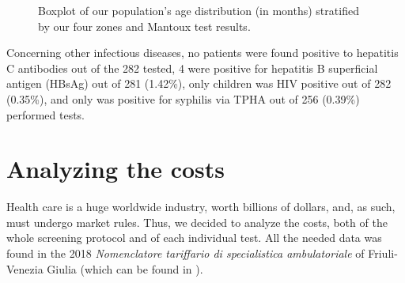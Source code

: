 \begin{figure}[H]
\caption{Boxplot of our population's age distribution (in months) stratified by our four zones and Mantoux test results.}
\label{fig:boxplot_Mantoux}
\end{figure}

Concerning other infectious diseases, no patients were found positive to hepatitis C antibodies out of the 282 tested, 4 were positive for hepatitis B superficial antigen (HBsAg) out of 281 (1.42\%), only children was HIV positive out of 282 (0.35\%), and only was positive for syphilis via TPHA out of 256 (0.39\%) performed tests.

\section{Analyzing the costs}\label{sec:analyzingcosts}
Health care is a huge worldwide industry, worth billions of dollars, and, as such, must undergo market rules. Thus, we decided to analyze the costs, both of the whole screening protocol and of each individual test. All the needed data was found in the 2018 \textit{Nomenclatore tariffario di specialistica ambulatoriale} of Friuli-Venezia Giulia (which can be found in \cite{nomenclatore}).

